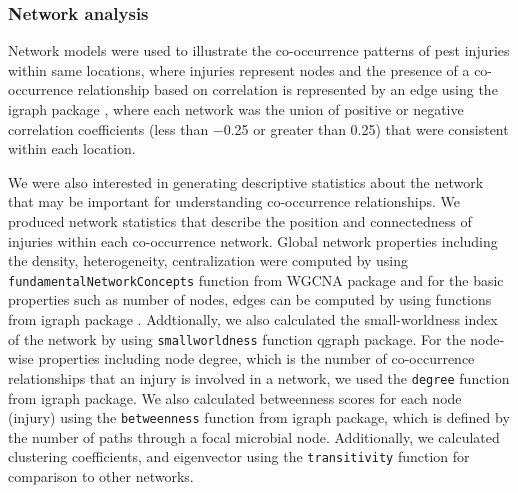 \subsubsection{Network analysis}

Network models were used to illustrate the co-occurrence patterns of pest injuries within same locations, where injuries represent nodes and the presence of a co-occurrence relationship based on correlation is represented by an edge using the igraph package \cite{igraph_2006}, where each network was the union of positive or negative correlation coefficients (less than −0.25 or greater than 0.25) that were consistent within each location. 

We were also interested in generating descriptive statistics about the network that may be important for understanding co-occurrence relationships. We produced network statistics that describe the position and connectedness of injuries within each co-occurrence network. Global network properties including the density, heterogeneity, centralization were computed by using \texttt{fundamentalNetworkConcepts} function from  WGCNA package \cite{Langfelder_2008} and for the basic properties such as number of nodes, edges can be computed by using functions from igraph package . Addtionally, we also calculated the small-worldness index of the network by using \texttt{smallworldness} function qgraph package. For the node-wise properties including node degree, which is the number of co-occurrence relationships that an injury is involved in a network, we used the \texttt{degree} function from igraph package. We also calculated betweenness scores for each node (injury) using the \texttt{betweenness} function from igraph package, which is defined by the number of paths through a focal microbial node. Additionally, we calculated clustering coefficients, and eigenvector using the \texttt{transitivity} function for comparison to other networks.

